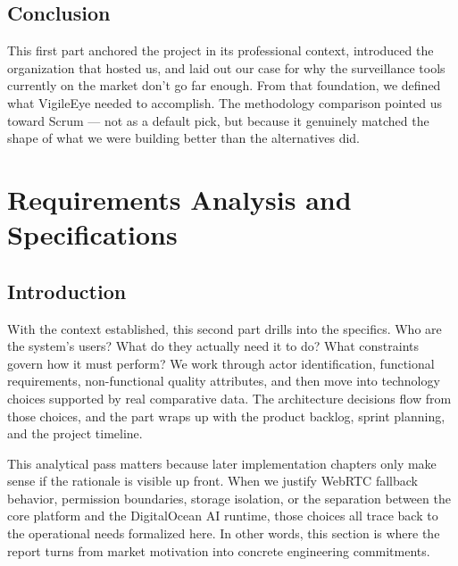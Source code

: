 \documentclass[12pt,a4paper,oneside]{report}
\begin{document}
\subsection*{Conclusion}

\hspace{0.8cm}This first part anchored the project in its professional context, introduced the organization that hosted us, and laid out our case for why the surveillance tools currently on the market don't go far enough. From that foundation, we defined what VigileEye needed to accomplish. The methodology comparison pointed us toward Scrum — not as a default pick, but because it genuinely matched the shape of what we were building better than the alternatives did.

\section{Requirements Analysis and Specifications}
\label{sec:requirements}

\subsection*{Introduction}

\hspace{0.8cm}With the context established, this second part drills into the specifics. Who are the system's users? What do they actually need it to do? What constraints govern how it must perform? We work through actor identification, functional requirements, non-functional quality attributes, and then move into technology choices supported by real comparative data. The architecture decisions flow from those choices, and the part wraps up with the product backlog, sprint planning, and the project timeline.

\hspace{0.8cm}This analytical pass matters because later implementation chapters only make sense if the rationale is visible up front. When we justify WebRTC fallback behavior, permission boundaries, storage isolation, or the separation between the core platform and the DigitalOcean AI runtime, those choices all trace back to the operational needs formalized here. In other words, this section is where the report turns from market motivation into concrete engineering commitments.

\end{document}
